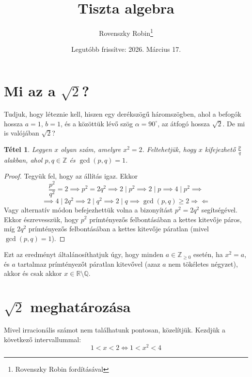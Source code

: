 \documentclass{article}
\title{Tiszta algebra}
\author{Rovenszky Robin\thanks{Rovenszky Robin fordításával}}
\date{Legutóbb frissítve: 2026. Március 17.}
\newtheorem{theorem}{Tétel}
\begin{document}
\maketitle
\tableofcontents
\newpage

\section{Mi az a $\sqrt{2}$?}
Tudjuk, hogy léteznie kell, hiszen egy derékszögű háromszögben, ahol a befogók hossza $a = 1$, $b = 1$, és a közöttük lévő szög $\alpha = 90^\circ$, az átfogó hossza $\sqrt{2}$. De mi is valójában $\sqrt{2}$?\\

\begin{theorem}
    Legyen $x$ olyan szám, amelyre $x^2 = 2$. Feltehetjük, hogy $x$ kifejezhető $\frac{p}{q}$ alakban, ahol $p, q \in \mathbb{Z}$ és $\gcd(p,q) = 1$.
\end{theorem}

\begin{proof}
    Tegyük fel, hogy az állítás igaz. Ekkor
    \begin{equation}
        \frac{p^2}{q^2} = 2 \implies p^2 = 2q^2 \implies 2 \mid p^2 \implies 2 \mid p \implies 4 \mid p^2 \implies
    \end{equation}
    \begin{equation}
        \implies 4 \mid 2q^2 \implies 2 \mid q^2 \implies 2 \mid q \implies \gcd(p, q) \ge 2 \Rightarrow\!\Leftarrow
    \end{equation}
    Vagy alternatív módon befejezhettük volna a bizonyítást $p^2 = 2q^2$ segítségével. Ekkor észrevesszük, hogy $p^2$ prímtényezős felbontásában a kettes kitevője páros, míg $2q^2$ prímtényezős felbontásában a kettes kitevője páratlan (mivel $\gcd(p,q) = 1$).
\end{proof}

Ezt az eredményt általánosíthatjuk úgy, hogy minden $a \in \mathbb{Z}_{\ge 0}$ esetén, ha $x^2 = a$, és $a$ tartalmaz prímtényezőt páratlan kitevővel (azaz $a$ nem tökéletes négyzet), akkor és csak akkor $x \in \mathbb{R} \setminus \mathbb{Q}$.

\section{$\sqrt{2}$ meghatározása}
Mivel irracionális számot nem találhatunk pontosan, közelítjük. Kezdjük a következő intervallummal:
\[
1 < x < 2 \Leftrightarrow 1 < x^2 < 4
\]
\end{document}
